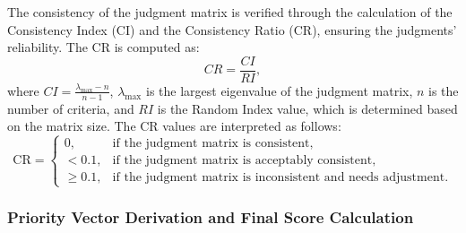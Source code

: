 \documentclass{mcmthesis}
\begin{document}
\begin{table}[h]
    \centering
    \end{table}

The consistency of the judgment matrix is verified through the calculation of the Consistency Index (CI) and the Consistency Ratio (CR), ensuring the judgments' reliability. The CR is computed as:
\begin{equation}
CR = \frac{CI}{RI},
\end{equation}
where $CI = \frac{\lambda_{\text{max}} - n}{n - 1}$, $\lambda_{\text{max}}$ is the largest eigenvalue of the judgment matrix, $n$ is the number of criteria, and $RI$ is the Random Index value, which is determined based on the matrix size. The CR values are interpreted as follows:
\begin{equation*}
\text{CR} = 
\begin{cases}
0, & \text{if the judgment matrix is consistent,} \\
< 0.1, & \text{if the judgment matrix is acceptably consistent,} \\
\geq 0.1, & \text{if the judgment matrix is inconsistent and needs adjustment.}
\end{cases}
\end{equation*}

\subsubsection{Priority Vector Derivation and Final Score Calculation}
\end{document}
